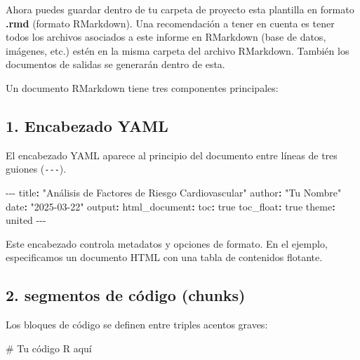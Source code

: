 \documentclass[
  letterpaper,
  DIV=11,
  numbers=noendperiod]{scrreprt}
\newenvironment{Shaded}{\begin{snugshade}}{\end{snugshade}}
\newcommand{\AttributeTok}[1]{\textcolor[rgb]{0.40,0.45,0.13}{#1}}
\newcommand{\CharTok}[1]{\textcolor[rgb]{0.13,0.47,0.30}{#1}}
\newcommand{\CommentTok}[1]{\textcolor[rgb]{0.37,0.37,0.37}{#1}}
\newcommand{\FunctionTok}[1]{\textcolor[rgb]{0.28,0.35,0.67}{#1}}
\newcommand{\KeywordTok}[1]{\textcolor[rgb]{0.00,0.23,0.31}{\textbf{#1}}}
\newcommand{\PreprocessorTok}[1]{\textcolor[rgb]{0.68,0.00,0.00}{#1}}
\newcommand{\StringTok}[1]{\textcolor[rgb]{0.13,0.47,0.30}{#1}}
\begin{document}
Ahora puedes guardar dentro de tu carpeta de proyecto esta plantilla en
formato \textbf{.rmd} (formato RMarkdown). Una recomendación a tener en
cuenta es tener todos los archivos asociados a este informe en RMarkdown
(base de datos, imágenes, etc.) estén en la misma carpeta del archivo
RMarkdown. También los documentos de salidas se generarán dentro de
esta.

Un documento RMarkdown tiene tres componentes principales:

\subsection{1. Encabezado YAML}\label{encabezado-yaml}

El encabezado YAML aparece al principio del documento entre líneas de
tres guiones (\texttt{-\/-\/-}).

\begin{Shaded}
\begin{Highlighting}[]
\PreprocessorTok{{-}{-}{-}}
\FunctionTok{title}\KeywordTok{:}\AttributeTok{ }\StringTok{"Análisis de Factores de Riesgo Cardiovascular"}
\FunctionTok{author}\KeywordTok{:}\AttributeTok{ }\StringTok{"Tu Nombre"}
\FunctionTok{date}\KeywordTok{:}\AttributeTok{ }\StringTok{"2025{-}03{-}22"}
\FunctionTok{output}\KeywordTok{:}\AttributeTok{ }
\AttributeTok{  }\FunctionTok{html\_document}\KeywordTok{:}
\AttributeTok{    }\FunctionTok{toc}\KeywordTok{:}\AttributeTok{ }\CharTok{true}
\AttributeTok{    }\FunctionTok{toc\_float}\KeywordTok{:}\AttributeTok{ }\CharTok{true}
\AttributeTok{    }\FunctionTok{theme}\KeywordTok{:}\AttributeTok{ united}
\PreprocessorTok{{-}{-}{-}}
\end{Highlighting}
\end{Shaded}

Este encabezado controla metadatos y opciones de formato. En el ejemplo,
especificamos un documento HTML con una tabla de contenidos flotante.

\subsection{2. segmentos de código
(chunks)}\label{segmentos-de-cuxf3digo-chunks}

Los bloques de código se definen entre triples acentos graves:

\begin{Shaded}
\begin{Highlighting}[]
\CommentTok{\# Tu código R aquí}
\end{Highlighting}
\end{Shaded}
\end{document}
